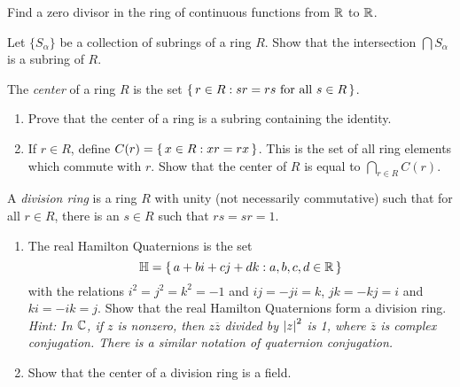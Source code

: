 \documentclass[./main.tex]{subfiles}
\begin{document}
\begin{exercise}
\label{ex:real-valued-cts-functions-is-not-an-integral-domain}
    Find a zero divisor in the ring of continuous functions from $\mathbb{R}$ to $\mathbb{R}$.
\end{exercise}

\begin{exercise}
    Let $\{S_\alpha\}$ be a collection of subrings of a ring $R$. Show that the
    intersection $\bigcap S_\alpha$ is a subring of $R$.
\end{exercise}

\begin{exercise}
\label{ex:center-of-rings}
    The \emph{center} of a ring $R$ is the set $\set{r \in R: sr = rs \text{ for
    all } s \in R}$. 
    
    \begin{enumerate}[label=(\alph*)]
        \item Prove that the center of a ring is a subring containing the
        identity.
        \item If $r \in R$, define $C(r) = \set{x \in R: xr = rx}$. This is the
        set of all ring elements which commute with $r$. Show that the center of
        $R$ is equal to $\bigcap_{r \in R} C(r)$. 
    \end{enumerate}
\end{exercise}


\begin{exercise}
\label{ex:division-rings}
    A \emph{division ring} is a ring $R$ with unity (not necessarily
    commutative) such that for all $r \in R$, there is an $s \in R$ such that
    $rs = sr = 1$.

    \begin{enumerate}[label=(\alph*)]
        \item The real Hamilton Quaternions is the set 
        \[
            \mathbb{H} = \set{a + bi + cj + dk: a,b,c,d \in \mathbb{R}}
        \]
        with the relations $i^2 = j^2 = k^2 = -1$ and $ij = -ji = k$, $jk = -kj
        = i$ and $ki = -ik = j$. Show that the real Hamilton Quaternions form a
        division ring. \textit{Hint: In $\mathbb{C}$, if $z$ is nonzero, then $z
        \overline z$ divided by $\abs z^2$ is 1, where $\overline z$ is complex
        conjugation. There is a similar notation of quaternion conjugation.}

        \item Show that the center of a division ring is a field.
    \end{enumerate}
\end{exercise}
\end{document}
